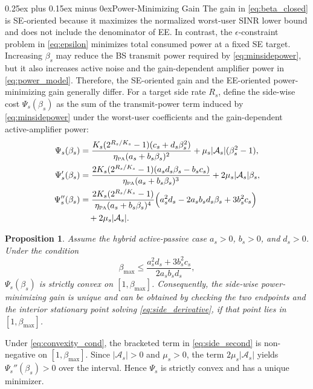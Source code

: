 \documentclass[journal]{IEEEtran}
\makeatletter
\def\subsection{\@startsection{subsection}{2}{\z@}{1.05ex plus 0.35ex minus 0.2ex}%
{0.25ex plus 0.15ex minus 0ex}{\normalfont\normalsize\itshape}}%
\newtheorem{proposition}{Proposition}
\newcommand{\etaPA}{\eta_{\scriptscriptstyle\mathrm{PA}}}
\makeatother
\begin{document}
\subsection{Power-Minimizing Gain}
The gain in \eqref{eq:beta_closed} is SE-oriented because it maximizes the normalized worst-user SINR lower bound and does not include the denominator of EE. In contrast, the $\epsilon$-constraint problem in \eqref{eq:epsilon} minimizes total consumed power at a fixed SE target. Increasing $\beta_s$ may reduce the BS transmit power required by \eqref{eq:minsidepower}, but it also increases active noise and the gain-dependent amplifier power in \eqref{eq:power_model}. Therefore, the SE-oriented gain and the EE-oriented power-minimizing gain generally differ. For a target side rate $R_s$, define the side-wise cost $\Psi_s(\beta_s)$ as the sum of the transmit-power term induced by \eqref{eq:minsidepower} under the worst-user coefficients and the gain-dependent active-amplifier power:
\begin{align}
\Psi_s(\beta_s)
&=\frac{K_s(2^{R_s/K_s}-1)(c_s+d_s\beta_s^2)}{\etaPA(a_s+b_s\beta_s)^2}
+\mu_s|\mathcal{A}_s|(\beta_s^2-1),
\label{eq:side_cost}\\
\Psi_s'(\beta_s)
&=\frac{2K_s(2^{R_s/K_s}-1)(a_sd_s\beta_s-b_sc_s)}{\etaPA(a_s+b_s\beta_s)^3}
+2\mu_s|\mathcal{A}_s|\beta_s,
\label{eq:side_derivative}\\
\Psi_s''(\beta_s)
&=\frac{2K_s(2^{R_s/K_s}-1)}{\etaPA(a_s+b_s\beta_s)^4}
\Big(a_s^2d_s-2a_sb_sd_s\beta_s+3b_s^2c_s\Big) \notag\\
&\quad +2\mu_s|\mathcal{A}_s|.
\label{eq:side_second}
\end{align}

\begin{proposition}\label{prop:convexity}
Assume the hybrid active-passive case $a_s>0$, $b_s>0$, and $d_s>0$. Under the condition
\begin{equation}
\beta_{\max}
\le
\frac{a_s^2d_s+3b_s^2c_s}{2a_sb_sd_s},
\label{eq:convexity_cond}
\end{equation}
$\Psi_s(\beta_s)$ is strictly convex on $[1,\beta_{\max}]$. Consequently, the side-wise power-minimizing gain is unique and can be obtained by checking the two endpoints and the interior stationary point solving \eqref{eq:side_derivative}, if that point lies in $[1,\beta_{\max}]$.
\end{proposition}

\begin{IEEEproof}
Under \eqref{eq:convexity_cond}, the bracketed term in \eqref{eq:side_second} is non-negative on $[1,\beta_{\max}]$. Since $|\mathcal{A}_s|>0$ and $\mu_s>0$, the term $2\mu_s|\mathcal{A}_s|$ yields $\Psi_s''(\beta_s)>0$ over the interval. Hence $\Psi_s$ is strictly convex and has a unique minimizer.
\end{IEEEproof}
\end{document}
